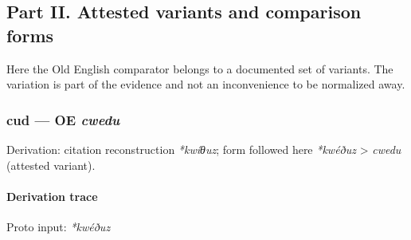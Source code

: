 \documentclass[
  british,
  a4paper,
]{article}
\begin{document}
\clearpage

\subsection{Part II. Attested variants and comparison
forms}\label{part-ii.-attested-variants-and-comparison-forms}

Here the Old English comparator belongs to a documented set of variants.
The variation is part of the evidence and not an inconvenience to be
normalized away.

\subsubsection{\texorpdfstring{cud --- OE
\emph{cwedu}}{cud --- OE cwedu}}\label{cud-oe-cwedu}

Derivation: citation reconstruction \emph{*kwíθuz}; form followed here
\emph{*kwéðuz} \textgreater{} \emph{cwedu} (attested variant).

\paragraph{Derivation trace}\label{derivation-trace-105}

Proto input: \emph{*kwéðuz}

\begingroup
\setlength{\fboxsep}{6pt}
\end{document}
